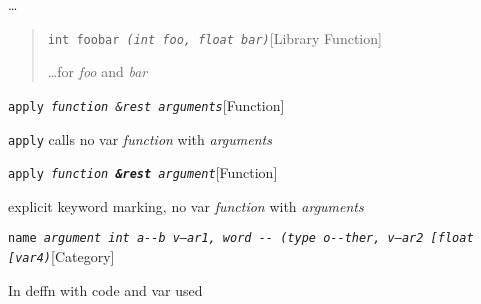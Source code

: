 \documentclass{book}
\begin{document}
%
\dots{}\@

\begin{quote}
\noindent\texttt{int foobar \bgroup{}\normalfont{}\textsl{(int \textsl{foo}, float \textsl{bar})}\egroup{}}\hfill[Library Function]



%
\dots{}\@ for \textsl{foo} and \textsl{bar}
\end{quote}

\noindent\texttt{apply \bgroup{}\normalfont{}\textsl{function \&rest arguments}\egroup{}}\hfill[Function]



%
\texttt{apply} calls no var \textsl{function} with \textsl{arguments}

\noindent\texttt{apply \bgroup{}\normalfont{}\textsl{function \textnormal{\textbf{\&rest}} argument}\egroup{}}\hfill[Function]



%
explicit keyword marking, no var \textsl{function} with \textsl{arguments}

\noindent\texttt{name \bgroup{}\normalfont{}\textsl{argument \texttt{int} \texttt{a{-}{-}b} \textsl{v--ar1}, word \texttt{{-}{-}} (\texttt{type o{-}{-}ther}, \textsl{v---ar2}  {[}\texttt{float} {[}\textsl{var4})}\egroup{}}\hfill[Category]



%
In deffn with code and var used
\end{document}
